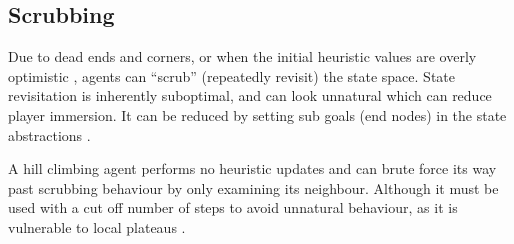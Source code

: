\documentclass{scrartcl}
\begin{document}
\subsection*{Scrubbing}

Due to dead ends and corners, or when the initial heuristic values are overly optimistic \cite{bulitko2011real}, agents can ``scrub'' (repeatedly revisit) the state space.  State revisitation is inherently suboptimal, and can look unnatural which can reduce player immersion.  It can be reduced by setting sub goals (end nodes) in the state abstractions \cite{bulitko2010case}.

A hill climbing agent performs no heuristic updates \cite{huntley2013search} and can brute force its way past scrubbing behaviour by only examining its neighbour.  Although it must be used with a cut off number of steps to avoid unnatural behaviour, as it is vulnerable to local plateaus \cite{richards1992learning}.



\end{document}

